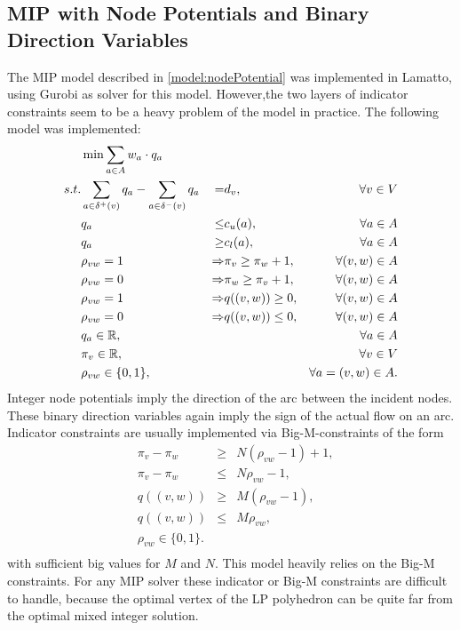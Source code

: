 \subsection{MIP with Node Potentials and Binary Direction Variables}
The MIP model described in \ref{model:nodePotential} was implemented in Lamatto, using Gurobi as solver for this 
model. However,the two layers of indicator constraints seem to be a heavy problem of the model in 
practice. The following model was implemented:
\begin{align*}
  &\min \sum_{a\in A} w_a\cdot q_a & \\
 s.t. & \sum_{a\in \delta^+(v)}q_a - \sum_{a\in\delta^- (v)}q_a &=& d_v, &\forall v\in V \\
 & q_a &\le& c_u(a),& \forall a\in A\\
 & q_a &\ge& c_l(a), & \forall a\in A\\
 & \rho_{vw}=1 &\Rightarrow &\pi_v\ge\pi_w +1, & \forall (v,w)\in A\\
 & \rho_{vw}=0 &\Rightarrow &\pi_w\ge\pi_v +1,& \forall (v,w)\in A\\
 & \rho_{vw}=1 &\Rightarrow &q((v,w))\ge 0,& \forall (v,w)\in A\\
 & \rho_{vw}=0 &\Rightarrow &q((v,w))\le 0,& \forall (v,w)\in A\\
 & q_a \in \mathbb{R}, & & &\forall a\in A\\
 & \pi_v \in \mathbb{R}, & & & \forall v\in V\\
 & \rho_{vw} \in \{0,1\},&&& \forall a=(v,w)\in A.\\
\end{align*}
Integer node potentials imply the direction of the arc between the incident nodes. These binary direction 
variables again imply the sign of the actual flow on an arc. Indicator constraints are usually implemented via 
Big-M-constraints of the form 
\begin{align*}
 &\pi_v-\pi_w &\ge & N(\rho_{vw}-1)+1,\\
 &\pi_v-\pi_w&\le &N\rho_{vw}-1, \\
 &q((v,w))&\ge& M(\rho_{vw}-1),\\
 &q((v,w))&\le & M\rho_{vw},\\
 &\rho_{vw} \in \{0,1\}.&&\\
\end{align*}
with sufficient big values for $M$ and $N$. This model heavily relies on the Big-M constraints.
For any MIP solver these indicator or Big-M constraints are difficult to handle, because the optimal vertex of the LP 
polyhedron can be quite far from the optimal mixed integer solution.\\

